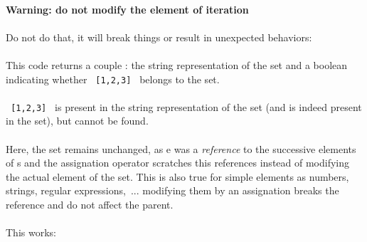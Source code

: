 \documentclass{article}
\let\subsubsubsection\paragraph
\begin{document}
\begin{sloppypar}
         {}
         
         {}

         

\subsubsubsection{ Warning: do not modify the element of iteration\\}
\paragraph{}
Do not do that, it will break things or result in unexpected behaviors:
            {}

            
\paragraph{}
This code returns a couple : the string representation of the set and a boolean indicating whether \verb! [1,2,3] ! belongs to the set.
            
            
\paragraph{}
\verb! [1,2,3] ! is present in the string representation of the set (and is indeed present in the set), but cannot be found.

            {}

            
\paragraph{}
Here, the set remains unchanged, as e was a {\itshape reference} to the successive elements of s and the assignation operator scratches this references instead of modifying the actual element of the set. This is also true for simple elements as numbers, strings, regular expressions, ... modifying them by an assignation breaks the reference and do not affect the parent.

            
\paragraph{}
This works:
            {}


\end{sloppypar}
\end{document}
